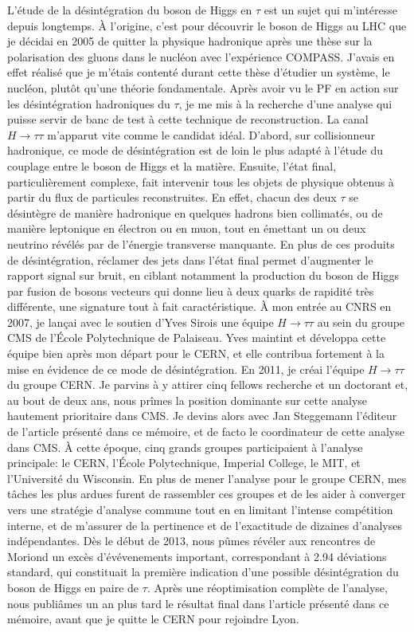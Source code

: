 L'étude de la désintégration du boson de Higgs en $\tau$ est un sujet qui m'intéresse depuis longtemps. 
À l'origine, c'est pour découvrir le boson de Higgs au LHC que je décidai en 2005 de quitter la physique hadronique après une thèse sur la polarisation des gluons dans le nucléon avec l'expérience COMPASS.
J'avais en effet réalisé que je m'étais contenté durant cette thèse d'étudier un système, le nucléon, plutôt qu'une théorie fondamentale. 
Après avoir vu le PF en action sur les désintégration hadroniques du $\tau$, 
je me mis à la recherche d'une analyse qui puisse servir de banc de test à cette technique de reconstruction. 
La canal $H \to \tau \tau$ m'apparut vite comme le candidat idéal. 
D'abord, sur collisionneur hadronique, ce mode de désintégration est de loin le plus adapté à l'étude du couplage entre le boson de Higgs et la matière. 
Ensuite, l'état final, particulièrement complexe, fait intervenir tous les objets de physique obtenus à partir du flux de particules reconstruites.
En effet, chacun des deux $\tau$ se désintègre de manière hadronique en quelques hadrons bien collimatés, 
ou de manière leptonique en électron ou en muon, tout en émettant un ou deux neutrino révélés par de l'énergie transverse manquante. 
En plus de ces produits de désintégration, réclamer des jets dans l'état final permet d'augmenter le rapport signal sur bruit, en ciblant notamment la production du boson de Higgs par fusion de bosons vecteurs qui donne lieu à deux quarks de rapidité très différente, une signature tout à fait caractéristique. 
À mon entrée au CNRS en 2007, je lançai avec le soutien d'Yves Sirois une équipe $H \to \tau \tau$ au sein du groupe CMS de l'École Polytechnique de Palaiseau. 
Yves maintint et développa cette équipe bien après mon départ pour le CERN, et elle contribua fortement à la mise en évidence de ce mode de désintégration. 
En 2011, je créai l'équipe $H \to \tau \tau$ du groupe CERN. 
Je parvins à y attirer cinq fellows recherche et un doctorant et, au bout de deux ans, nous prîmes la position dominante sur cette analyse hautement prioritaire dans CMS.
Je devins alors avec Jan Steggemann l'éditeur de l'article présenté dans ce mémoire, 
et de facto le coordinateur de cette analyse dans CMS. 
À cette époque, cinq grands groupes participaient à l'analyse principale: le CERN, l'École Polytechnique, Imperial College, le MIT, et l'Université du Wisconsin.
En plus de mener l'analyse pour le groupe CERN, mes tâches les plus ardues furent de rassembler ces groupes et de les aider à converger vers une stratégie d'analyse commune tout en en limitant l'intense compétition interne, 
et de m'assurer de la pertinence et de l'exactitude de dizaines d'analyses indépendantes.
Dès le début de 2013, nous pûmes révéler aux rencontres de Moriond 
un excès d'évévenements important, correspondant à 2.94 déviations standard, qui constituait la première indication d'une possible désintégration du boson de Higgs en paire de $\tau$. 
Après une réoptimisation complète de l'analyse, nous publiâmes un an plus tard le résultat final dans l'article présenté dans ce mémoire, avant que je quitte le CERN pour rejoindre Lyon.  

